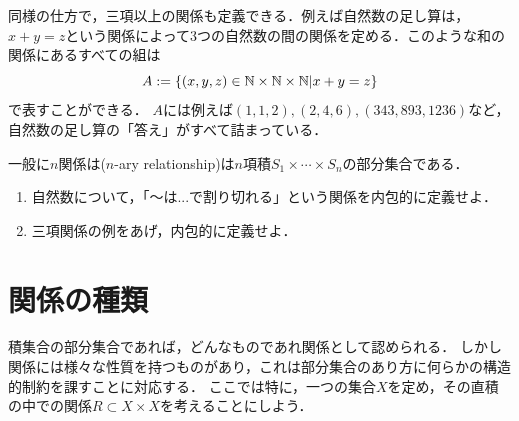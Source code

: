 \documentclass[dvipdfmx, 11pt,a4paper]{jsarticle}
\begin{document}
同様の仕方で，三項以上の関係も定義できる．例えば自然数の足し算は，$x + y = z$という関係によって3つの自然数の間の関係を定める．このような和の関係にあるすべての組は
\[
 A := \{ (x,y,z) \in \mathbb{N} \times \mathbb{N} \times \mathbb{N} | x + y = z \}
\]
で表すことができる．
$A$には例えば$(1,1,2), (2,4,6), (343,893, 1236)$など，自然数の足し算の「答え」がすべて詰まっている．

一般に$n$関係は($n$-ary relationship)は$n$項積$S_1 \times \cdots \times S_n$の部分集合である．

\begin{renshu}{}{}
\begin{enumerate}
 \item 自然数について，「〜は...で割り切れる」という関係を内包的に定義せよ．
 \item 三項関係の例をあげ，内包的に定義せよ．
\end{enumerate}
\end{renshu}


\section{関係の種類}
\label{sec:relation_kinds}
積集合の部分集合であれば，どんなものであれ関係として認められる．
しかし関係には様々な性質を持つものがあり，これは部分集合のあり方に何らかの構造的制約を課すことに対応する．
ここでは特に，一つの集合$X$を定め，その直積の中での関係$R \subset X \times X$を考えることにしよう．
\end{document}
